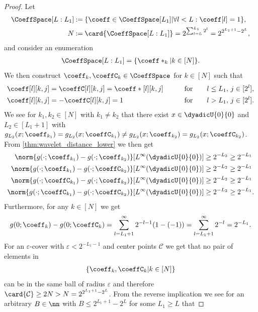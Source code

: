 \documentclass[twoside,11pt]{article}
\newcommand{\defeq}{\mathbin{:=}}
\newcommand{\set}[1]{\ensuremath{\mathcal{#1}}}
\begin{document}
\begin{proof}
Let
\begin{align}
    \CoeffSpace[L:L_1]
    &\defeq
    \{\coeff\in\CoeffSpace[L_1]|\forall l<L:\coeff[l]=1\},
    \\
    N
    &\defeq
    \card{\CoeffSpace[L:L_1]}=2^{\sum_{l=L}^{L_1}2^l}=2^{2^{L_1+1}-2^L},
\end{align}
and consider an enumeration
\begin{align}
    \CoeffSpace[L:L_1]=\{\coeff*_k|k\in[N]\}.
\end{align}
We then construct $\coeff_k,\coeffC_k\in\CoeffSpace$ for $k\in[N]$ such that
\begin{alignat}{2}
    \coeff[l][k,j]&=\coeffC[l][k,j]=\coeff*[l][k,j]&\qquad&\text{for}\qquad l\leq L_1,\, j\in[2^l],\\
    \coeff[l][k,j]&=-\coeffC[l][k,j]=1&&\text{for}\qquad l>L_1,\,j\in[2^l].
\end{alignat}
We see for $k_1,k_2\in[N]$ with $k_1\neq k_2$ that there exist $x\in\dyadicU{0}{0}$ and $L_2\in[L_1+1]$ with $g_{L_2}(x;\coeff_{k_1})=g_{L_2}(x;\coeffC_{k_1})\neq g_{L_2}(x;\coeff_{k_2})=g_{L_2}(x;\coeffC_{k_2})$.
From \cref{thm:wavelet_distance_lower} we then get
\begin{align}
    \norm{g(\cdot;\coeff_{k_1})-g(\cdot;\coeff_{k_2})}[L^\infty(\dyadicU{0}{0})]
    &\geq 2^{-L_2}\geq 2^{-L_1}
    \\
    \norm{g(\cdot;\coeff_{k_1})-g(\cdot;\coeffC_{k_2})}[L^\infty(\dyadicU{0}{0})]
    &\geq 2^{-L_2}\geq 2^{-L_1}
    \\
    \norm{g(\cdot;\coeffC_{k_1})-g(\cdot;\coeff_{k_2})}[L^\infty(\dyadicU{0}{0})]
    &\geq 2^{-L_2}\geq 2^{-L_1}
    \\
    \norm{g(\cdot;\coeffC_{k_1})-g(\cdot;\coeffC_{k_2})}[L^\infty(\dyadicU{0}{0})]
    &\geq 2^{-L_2}\geq 2^{-L_1}.
\end{align}
Furthermore, for any $k\in[N]$ we get
\begin{align}
    g(0;\coeff_k)-g(0;\coeffC_k)
    =
    \sum_{l=L_1+1}^\infty 2^{-l-1}(1-(-1))
    =
    \sum_{l=L_1+1}^\infty 2^{-l}
    =2^{-L_1}.
\end{align}
For an $\varepsilon$-cover with $\varepsilon<2^{-L_1-1}$ and center points $\set{C}$ we get that no pair of elements in
\begin{align}
    \{\coeff_k,\coeffC_k|k\in[N]\}
\end{align}
can be in the same ball of radius $\varepsilon$ and therefore $\card{\set{C}}\geq 2N>N=2^{2^{L_1+1}-2^{L}}$.
From the reverse implication we see for an arbitrary $B\in\nn$ with $B\leq 2^{L_1+1}-2^{L}$ for some $L_1\geq L$ that 

\end{proof}
\end{document}
